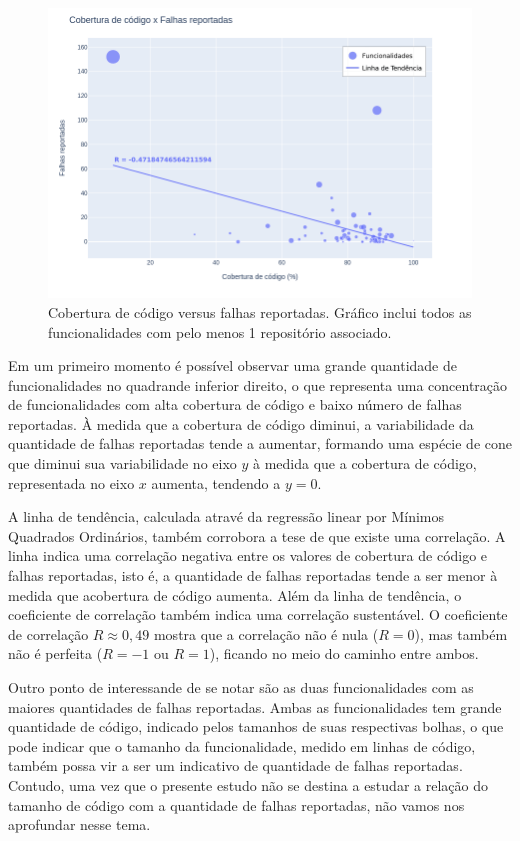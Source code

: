 \documentclass[11.5pt]{article}
\begin{document}
\begin{figure}[ht]
    \centering
    \includegraphics[width=1.0\textwidth]{cc_bugs_geral.png}
    \caption{Cobertura de código versus falhas reportadas. Gráfico inclui todos as funcionalidades
com pelo menos 1 repositório associado.}
    \label{fig:cc_bugs_geral}
\end{figure}

Em um primeiro momento é possível observar uma grande quantidade de funcionalidades no quadrande
inferior direito, o que representa uma concentração de funcionalidades com alta cobertura de código
e baixo número de falhas reportadas.
À medida que a cobertura de código diminui, a variabilidade da quantidade de falhas reportadas tende
a aumentar, formando uma espécie de cone que diminui sua variabilidade no eixo $y$ à medida que
a cobertura de código, representada no eixo $x$ aumenta, tendendo a $y = 0$.

A linha de tendência, calculada atravé da regressão linear por Mínimos Quadrados Ordinários,
também corrobora a tese de que existe uma correlação.
A linha indica uma correlação negativa entre os valores de cobertura de código e falhas reportadas,
isto é, a quantidade de falhas reportadas tende a ser menor à medida que acobertura de código
aumenta.
Além da linha de tendência, o coeficiente de correlação também indica uma correlação sustentável.
O coeficiente de correlação $R \approx 0,49$ mostra que a correlação não é nula ($R = 0$), mas
também não é perfeita ($R = -1$ ou $R = 1$), ficando no meio do caminho entre ambos.

Outro ponto de interessande de se notar são as duas funcionalidades com as maiores quantidades de
falhas reportadas.
Ambas as funcionalidades tem grande quantidade de código, indicado pelos tamanhos de suas
respectivas bolhas, o que pode indicar que o tamanho da funcionalidade, medido em linhas de código,
também possa vir a ser um indicativo de quantidade de falhas reportadas.
Contudo, uma vez que o presente estudo não se destina a estudar a relação do tamanho de código com
a quantidade de falhas reportadas, não vamos nos aprofundar nesse tema.
\end{document}

